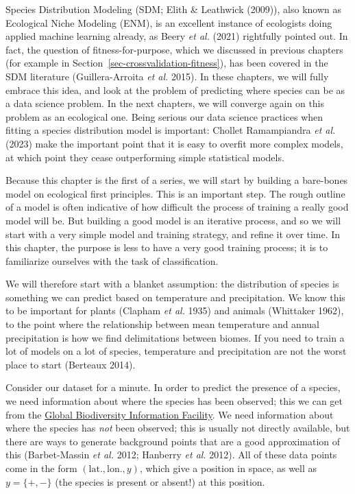\documentclass[
  letterpaper,
]{scrbook}
\begin{document}
Species Distribution Modeling (SDM; Elith \& Leathwick (2009)), also
known as Ecological Niche Modeling (ENM), is an excellent instance of
ecologists doing applied machine learning already, as Beery \emph{et
al.} (2021) rightfully pointed out. In fact, the question of
fitness-for-purpose, which we discussed in previous chapters (for
example in Section~\ref{sec-crossvalidation-fitness}), has been covered
in the SDM literature (Guillera-Arroita \emph{et al.} 2015). In these
chapters, we will fully embrace this idea, and look at the problem of
predicting where species can be as a data science problem. In the next
chapters, we will converge again on this problem as an ecological one.
Being serious our data science practices when fitting a species
distribution model is important: Chollet Ramampiandra \emph{et al.}
(2023) make the important point that it is easy to overfit more complex
models, at which point they cease outperforming simple statistical
models.

Because this chapter is the first of a series, we will start by building
a bare-bones model on ecological first principles. This is an important
step. The rough outline of a model is often indicative of how difficult
the process of training a really good model will be. But building a good
model is an iterative process, and so we will start with a very simple
model and training strategy, and refine it over time. In this chapter,
the purpose is less to have a very good training process; it is to
familiarize ourselves with the task of classification.

We will therefore start with a blanket assumption: the distribution of
species is something we can predict based on temperature and
precipitation. We know this to be important for plants (Clapham \emph{et
al.} 1935) and animals (Whittaker 1962), to the point where the
relationship between mean temperature and annual precipitation is how we
find delimitations between biomes. If you need to train a lot of models
on a lot of species, temperature and precipitation are not the worst
place to start (Berteaux 2014).

Consider our dataset for a minute. In order to predict the presence of a
species, we need information about where the species has been observed;
this we can get from the \href{https://www.gbif.org/}{Global
Biodiversity Information Facility}. We need information about where the
species has \emph{not} been observed; this is usually not directly
available, but there are ways to generate background points that are a
good approximation of this (Barbet-Massin \emph{et al.} 2012; Hanberry
\emph{et al.} 2012). All of these data points come in the form
\((\text{lat.}, \text{lon.}, y)\), which give a position in space, as
well as \(y = \{+,-\}\) (the species is present or absent!) at this
position.
\end{document}
